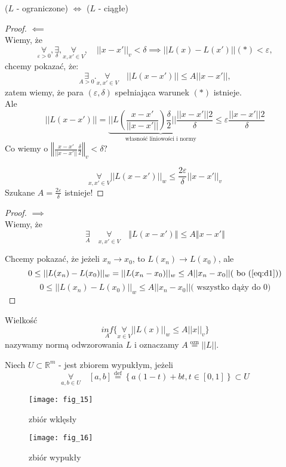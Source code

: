 \documentclass[../main.tex]{subfiles}
\begin{document}
\begin{tw}
    ($L$ - ograniczone) $\iff$ ($L$ - ciągłe)
\end{tw}

\begin{proof}
    $\impliedby$\\
    Wiemy, że
\[
    \underset{\varepsilon > 0}{\forall}, \underset{\delta}{\exists}, \underset{x,x'\in V}{\forall},\quad ||x-x'||_v < \delta \implies ||L(x) - L(x')||(*)< \varepsilon
,\]
chcemy pokazać, że:
\[
    \underset{A>0}{\exists}.\underset{x,x'\in V}{\forall}\quad ||L(x-x')|| \leq A||x-x'||,
\]
zatem wiemy, że para $(\varepsilon, \delta)$ spełniająca warunek $(*)$ istnieje.\\
Ale
    \[
        ||L(x-x')|| = \underbrace{\Bigg |\Bigg |L\left ( \frac{x-x'}{||x-x'||}\right ) \frac{\delta}{2}\Bigg |\Bigg | \frac{||x-x'|| 2}{\delta}}_{\text{własność liniowości i normy}} \leq \varepsilon \frac{||x-x'|| 2}{\delta}
    \]
Co wiemy o $\left\Vert \frac{x-x'}{||x-x'||} \frac{\delta}{2} \right\Vert_v < \delta?$

$$\underset{x,x'\in V}{\forall}||L(x-x')||_w \leq \frac{2 \varepsilon}{\delta} ||x-x'||_v$$
Szukane $A=\frac{2\varepsilon}{\delta}$ istnieje!
\end{proof}

\begin{proof}
    $\implies$\\
Wiemy, że
\begin{equation}\label{eq:d1}
    \underset{A}{\exists}\quad \underset{x,x'\in V}{\forall}\quad \left\Vert L(x-x')\right\Vert \leq A\left\Vert x-x' \right\Vert
\end{equation}

Chcemy pokazać, że jeżeli $x_n\to x_0$, to $L(x_n)\to L(x_0)$, ale
\[
    0 \leq ||L(x_n)-L(x_0)||_w = ||L(x_n-x_0)||_w \leq A||x_n-x_0||(\text{ bo (\ref{eq:d1})})
\]
\[
    0\leq ||L(x_n) - L(x_0)||_w \leq A||x_n - x_0||(\text{ wszystko dąży do 0)}
\]
\end{proof}

\begin{definicja}
    Wielkość
    \[
        \underset{A}{inf} \{\underset{x\in V}{\forall}||L(x)||_w \leq A||x||_v\}
    \]
    nazywamy normą odwzorowania $L$ i oznaczamy $A\overset{\text{ozn}}{=}||L||$.
\end{definicja}
\begin{definicja}
    Niech $U\subset \mathbb{R}^m$ - jest zbiorem wypukłym, jeżeli
    \[
        \underset{a,b\in U}{\forall}\quad [a,b]\overset{\text{def}}{=} \left \{ a(1-t)+bt, t\in[0,1] \right \} \subset U
    \]
\end{definicja}
\begin{figure}
    \centering
    \texttt{[image: fig\_15]}
    \caption{zbiór wklęsły}
\end{figure}
\begin{figure}
    \centering
    \texttt{[image: fig\_16]}
    \caption{zbiór wypukły}
\end{figure}
\end{document}
